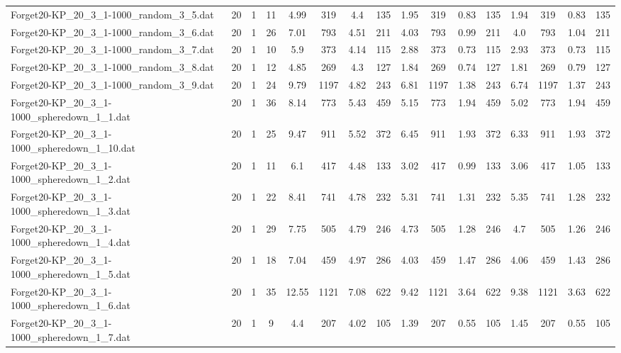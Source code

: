 \begin{sidewaystable}[!ht]
{\begin{tabular}{lccccccccccccccc}
Forget20-KP\_20\_3\_1-1000\_random\_3\_5.dat & 20 & 1 & 11 & 4.99 & 319 & 4.4 & 135 & 1.95 & 319 &  \textcolor{blue2}{0.83} & 135 & 1.94 & 319 &  \textcolor{blue2}{0.83} & 135 \\
Forget20-KP\_20\_3\_1-1000\_random\_3\_6.dat & 20 & 1 & 26 & 7.01 & 793 & 4.51 & 211 & 4.03 & 793 &  \textcolor{blue2}{0.99} & 211 & 4.0 & 793 & 1.04 & 211 \\
Forget20-KP\_20\_3\_1-1000\_random\_3\_7.dat & 20 & 1 & 10 & 5.9 & 373 & 4.14 & 115 & 2.88 & 373 &  \textcolor{blue2}{0.73} & 115 & 2.93 & 373 &  \textcolor{blue2}{0.73} & 115 \\
Forget20-KP\_20\_3\_1-1000\_random\_3\_8.dat & 20 & 1 & 12 & 4.85 & 269 & 4.3 & 127 & 1.84 & 269 &  \textcolor{blue2}{0.74} & 127 & 1.81 & 269 & 0.79 & 127 \\
Forget20-KP\_20\_3\_1-1000\_random\_3\_9.dat & 20 & 1 & 24 & 9.79 & 1197 & 4.82 & 243 & 6.81 & 1197 & 1.38 & 243 & 6.74 & 1197 &  \textcolor{blue2}{1.37} & 243 \\
Forget20-KP\_20\_3\_1-1000\_spheredown\_1\_1.dat & 20 & 1 & 36 & 8.14 & 773 & 5.43 & 459 & 5.15 & 773 & 1.94 & 459 & 5.02 & 773 & 1.94 & 459 \\
Forget20-KP\_20\_3\_1-1000\_spheredown\_1\_10.dat & 20 & 1 & 25 & 9.47 & 911 & 5.52 & 372 & 6.45 & 911 &  \textcolor{blue2}{1.93} & 372 & 6.33 & 911 &  \textcolor{blue2}{1.93} & 372 \\
Forget20-KP\_20\_3\_1-1000\_spheredown\_1\_2.dat & 20 & 1 & 11 & 6.1 & 417 & 4.48 & 133 & 3.02 & 417 &  \textcolor{blue2}{0.99} & 133 & 3.06 & 417 & 1.05 & 133 \\
Forget20-KP\_20\_3\_1-1000\_spheredown\_1\_3.dat & 20 & 1 & 22 & 8.41 & 741 & 4.78 & 232 & 5.31 & 741 & 1.31 & 232 & 5.35 & 741 &  \textcolor{blue2}{1.28} & 232 \\
Forget20-KP\_20\_3\_1-1000\_spheredown\_1\_4.dat & 20 & 1 & 29 & 7.75 & 505 & 4.79 & 246 & 4.73 & 505 & 1.28 & 246 & 4.7 & 505 & 1.26 & 246 \\
Forget20-KP\_20\_3\_1-1000\_spheredown\_1\_5.dat & 20 & 1 & 18 & 7.04 & 459 & 4.97 & 286 & 4.03 & 459 & 1.47 & 286 & 4.06 & 459 &  \textcolor{blue2}{1.43} & 286 \\
Forget20-KP\_20\_3\_1-1000\_spheredown\_1\_6.dat & 20 & 1 & 35 & 12.55 & 1121 & 7.08 & 622 & 9.42 & 1121 & 3.64 & 622 & 9.38 & 1121 & 3.63 & 622 \\
Forget20-KP\_20\_3\_1-1000\_spheredown\_1\_7.dat & 20 & 1 & 9 & 4.4 & 207 & 4.02 & 105 & 1.39 & 207 & 0.55 & 105 & 1.45 & 207 & 0.55 & 105 \\

\end{tabular}}
\end{sidewaystable}
